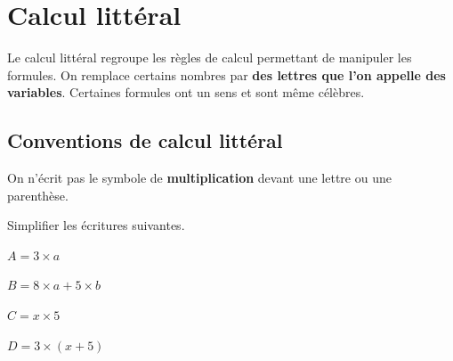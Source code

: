 \documentclass[a4paper]{book}
\begin{document}
\setcounter{chapter}{9}
\renewcommand{\monTitre}{Calcul littéral}
\chapter{\monTitre}
\thispagestyle{fancy} 

Le calcul littéral regroupe les règles de calcul permettant de manipuler les formules. On remplace certains nombres par \textbf{des lettres que l'on appelle des variables}. Certaines formules ont un sens et sont même célèbres. 

\vspace{2cm}

\section{Conventions de calcul littéral}
    

    \begin{convention}
        On n'écrit pas le symbole de \textbf{multiplication} devant une lettre ou une parenthèse.
    \end{convention}


    \begin{exemple}
        Simplifier les écritures suivantes.

        \medskip

        \begin{minipage}{0.24\linewidth}
            $A=3\times a$

            \vspace{1cm}
        \end{minipage}
        \hfill\vline\hfill
        \begin{minipage}{0.24\linewidth}
            $B=8\times a+5\times b$

            \vspace{1cm}
        \end{minipage}
        \hfill\vline\hfill
        \begin{minipage}{0.24\linewidth}
            $C=x\times 5$

            \vspace{1cm}
        \end{minipage}
        \hfill\vline\hfill
        \begin{minipage}{0.24\linewidth}
            $D=3\times (x+5)$

            \vspace{1cm}
        \end{minipage}
    \end{exemple}
\end{document}

